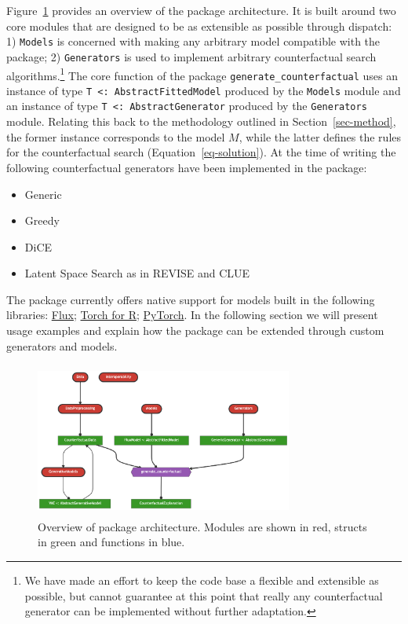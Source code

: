 \documentclass{juliacon}
\begin{document}
Figure~\ref{fig-arch} provides an overview of the package architecture.
It is built around two core modules that are designed to be as
extensible as possible through dispatch: 1) \texttt{Models} is concerned
with making any arbitrary model compatible with the package; 2)
\texttt{Generators} is used to implement arbitrary counterfactual search
algorithms.\footnote{We have made an effort to keep the code base a
  flexible and extensible as possible, but cannot guarantee at this
  point that really any counterfactual generator can be implemented
  without further adaptation.} The core function of the package
\texttt{generate\_counterfactual} uses an instance of type
\texttt{T\ \textless{}:\ AbstractFittedModel} produced by the
\texttt{Models} module and an instance of type
\texttt{T\ \textless{}:\ AbstractGenerator} produced by the
\texttt{Generators} module. Relating this back to the methodology
outlined in Section~\ref{sec-method}, the former instance corresponds to
the model \(M\), while the latter defines the rules for the
counterfactual search (Equation~\ref{eq-solution}). At the time of
writing the following counterfactual generators have been implemented in
the package:

\begin{itemize}
\item Generic \cite{wachter2017counterfactual}
\item Greedy \cite{schut2021generating}
\item DiCE \cite{mothilal2020explaining}
\item Latent Space Search as in REVISE \cite{joshi2019realistic} and CLUE \cite{antoran2020getting}
\end{itemize}

The package currently offers native support for models built in the
following libraries: \href{https://fluxml.ai/}{Flux};
\href{https://torch.mlverse.org/}{Torch for R};
\href{https://pytorch.org/}{PyTorch}. In the following section we will
present usage examples and explain how the package can be extended
through custom generators and models.

\begin{figure}

{\centering \includegraphics[width=3.33333in,height=2in]{www/pkg_architecture.png}

}

\caption{\label{fig-arch}Overview of package architecture. Modules are
shown in red, structs in green and functions in blue.}

\end{figure}
\end{document}
